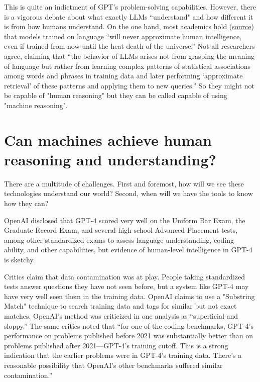 This is quite an indictment of GPT’s problem-solving capabilities. However, there is a vigorous debate about what exactly LLMs “understand" and how different it is from how humans understand. On the one hand, most academics hold (\href{https://www.science.org/doi/10.1126/science.adj5957}{source}) that models trained on language “will never approximate human intelligence, even if trained from now until the heat death of the universe.” Not all researchers agree, claiming that “the behavior of LLMs arises not from grasping the meaning of language but rather from learning complex patterns of statistical associations among words and phrases in training data and later performing ‘approximate retrieval’ of these patterns and applying them to new queries.” So they might not be capable of "human reasoning" but they can be called capable of using "machine reasoning".

\section*{Can machines achieve human reasoning and understanding?}

There are a multitude of challenges. First and foremost, how will we see these technologies understand our world? Second, when will we have the tools to know how they can?

OpenAI disclosed that GPT-4 scored very well on the Uniform Bar Exam, the Graduate Record Exam, and several high-school Advanced Placement tests, among other standardized exams to assess language understanding, coding ability, and other capabilities, but evidence of human-level intelligence in GPT-4 is sketchy.

Critics claim that data contamination was at play. People taking standardized tests answer questions they have not seen before, but a system like GPT-4 may have very well seen them in the training data. OpenAI claims to use a "Substring Match" technique to search training data and tags for similar but not exact matches. OpenAI’s method was criticized in one analysis as “superficial and sloppy.” The same critics noted that “for one of the coding benchmarks, GPT-4’s performance on problems published before 2021 was substantially better than on problems published after 2021—GPT-4’s training cutoff. This is a strong indication that the earlier problems were in GPT-4’s training data. There’s a reasonable possibility that OpenAI’s other benchmarks suffered similar contamination.”

